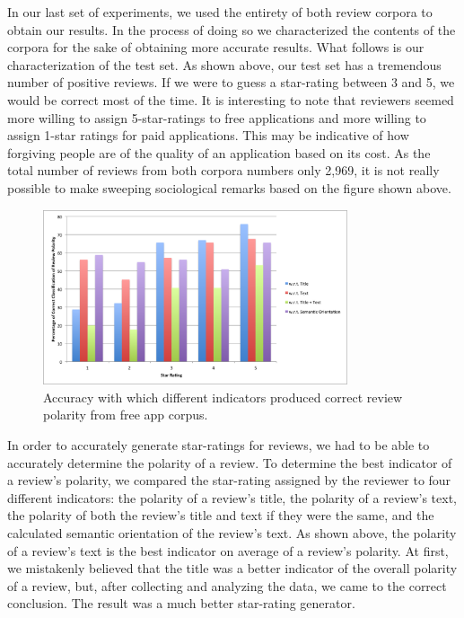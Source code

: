 \documentclass[11pt]{report} %
\begin{document}
In our last set of experiments, we used the entirety of both review corpora to obtain our results. In the process of doing so we characterized the contents of the corpora for the sake of obtaining more accurate results. What follows is our characterization of the test set. As shown above, our test set has a tremendous number of positive reviews. If we were to guess a star-rating between 3 and 5, we would be correct most of the time. It is interesting to note that reviewers seemed more willing to assign 5-star-ratings to free applications and more willing to assign 1-star ratings for paid applications. This may be indicative of how forgiving people are of the quality of an application based on its cost. As the total number of reviews from both corpora numbers only 2,969, it is not really possible to make sweeping sociological remarks based on the figure shown above. 	


	\begin{figure}[H]
	\centering
	\includegraphics[width=0.8\textwidth]{data/pmi-cue-free-pol-acc.png}
	\caption{Accuracy with which different indicators produced correct review polarity from free app corpus.}
	\label{fig:pmi-cue-free-pol-acc}
	\end{figure}

In order to accurately generate star-ratings for reviews, we had to be able to accurately determine the polarity of a review. To determine the best indicator of a review's polarity, we compared the star-rating assigned by the reviewer to four different indicators: the polarity of a review's title, the polarity of a review's text, the polarity of both the review's title and text if they were the same, and the calculated semantic orientation of the review's text. As shown above, the polarity of a review's text is the best indicator on average of a review's polarity. At first, we mistakenly believed that the title was a better indicator of the overall polarity of a review, but, after collecting and analyzing the data, we came to the correct conclusion. The result was a much better star-rating generator. 
\end{document}
